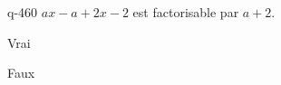 \begin{truefalse}{q-460}
$ax-a+2x-2$ est factorisable par $a+2$.
\item* Vrai
\item Faux
\end{truefalse}

